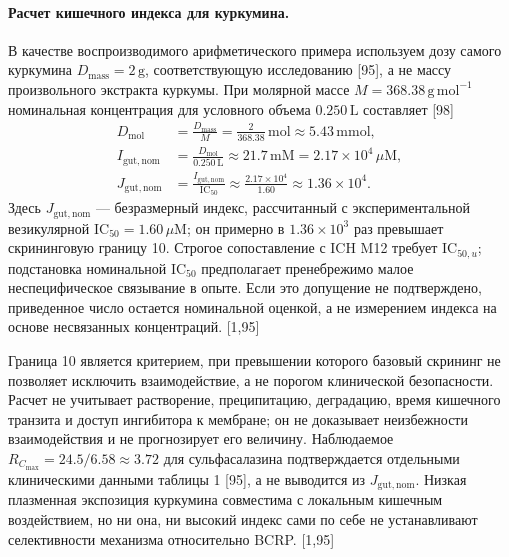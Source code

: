 \documentclass[11pt]{article}
\begin{document}
\paragraph{Расчет кишечного индекса для куркумина.}
В качестве воспроизводимого арифметического примера используем дозу самого куркумина \(D_{\mathrm{mass}}=2\,\mathrm{g}\), соответствующую исследованию [95], а не массу произвольного экстракта куркумы. При молярной массе \(M=368.38\,\mathrm{g\,mol}^{-1}\) номинальная концентрация для условного объема \(0.250\,\mathrm{L}\) составляет [98]
\[
\begin{aligned}
D_{\mathrm{mol}}&=\frac{D_{\mathrm{mass}}}{M}
=\frac{2}{368.38}\,\mathrm{mol}\approx5.43\,\mathrm{mmol},\\
I_{\mathrm{gut,nom}}&=\frac{D_{\mathrm{mol}}}{0.250\,\mathrm{L}}
\approx21.7\,\mathrm{mM}=2.17\times10^{4}\,\mu\mathrm{M},\\
J_{\mathrm{gut,nom}}&=\frac{I_{\mathrm{gut,nom}}}{\mathrm{IC}_{50}}
\approx\frac{2.17\times10^{4}}{1.60}\approx1.36\times10^{4}.
\end{aligned}
\]
Здесь \(J_{\mathrm{gut,nom}}\) --- безразмерный индекс, рассчитанный с экспериментальной везикулярной \(\mathrm{IC}_{50}=1.60\,\mu\mathrm{M}\); он примерно в \(1.36\times10^{3}\) раз превышает скрининговую границу 10. Строгое сопоставление с ICH M12 требует \(\mathrm{IC}_{50,u}\); подстановка номинальной \(\mathrm{IC}_{50}\) предполагает пренебрежимо малое неспецифическое связывание в опыте. Если это допущение не подтверждено, приведенное число остается номинальной оценкой, а не измерением индекса на основе несвязанных концентраций. [1,95]

Граница 10 является критерием, при превышении которого базовый скрининг не позволяет исключить взаимодействие, а не порогом клинической безопасности. Расчет не учитывает растворение, преципитацию, деградацию, время кишечного транзита и доступ ингибитора к мембране; он не доказывает неизбежности взаимодействия и не прогнозирует его величину. Наблюдаемое \(R_{C_{\max}}=24.5/6.58\approx3.72\) для сульфасалазина подтверждается отдельными клиническими данными таблицы 1 [95], а не выводится из \(J_{\mathrm{gut,nom}}\). Низкая плазменная экспозиция куркумина совместима с локальным кишечным воздействием, но ни она, ни высокий индекс сами по себе не устанавливают селективности механизма относительно BCRP. [1,95]
\end{document}
